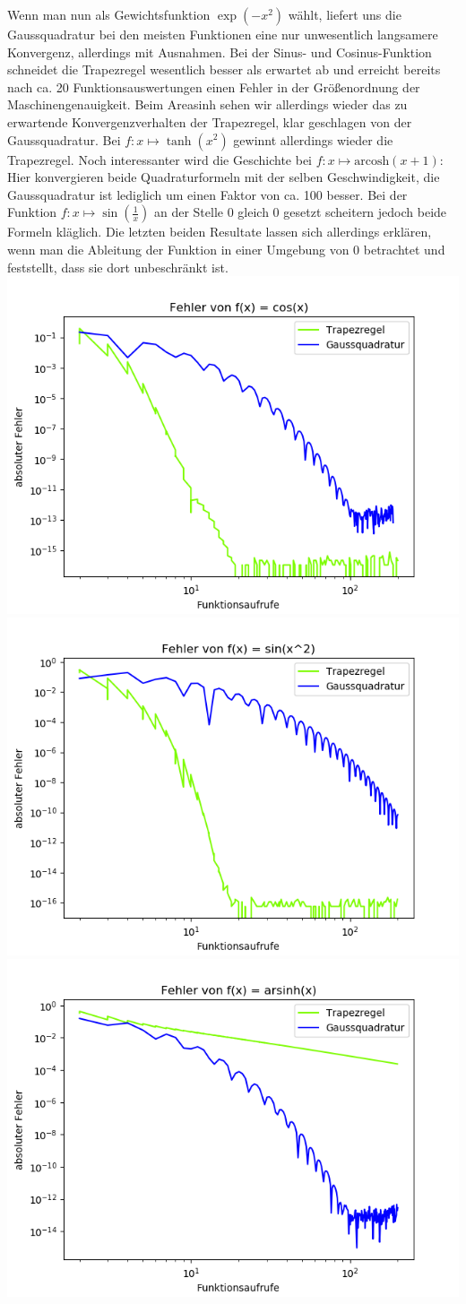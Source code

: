 Wenn man nun als Gewichtsfunktion $\exp(-x^{2})$ wählt, liefert uns die Gaussquadratur bei den meisten Funktionen eine nur unwesentlich langsamere Konvergenz, allerdings mit Ausnahmen.
Bei der Sinus- und Cosinus-Funktion schneidet die Trapezregel wesentlich besser als erwartet ab und erreicht bereits nach ca. 20 Funktionsauswertungen einen Fehler in der Größenordnung der Maschinengenauigkeit. Beim Areasinh sehen wir allerdings wieder das zu erwartende Konvergenzverhalten der Trapezregel, klar geschlagen von der Gaussquadratur. Bei $f: x \mapsto \tanh(x^2)$ gewinnt allerdings wieder die Trapezregel. Noch interessanter wird die Geschichte bei $f: x \mapsto \text{arcosh}(x+1)$: Hier konvergieren beide Quadraturformeln mit der selben Geschwindigkeit, die Gaussquadratur ist lediglich um einen Faktor von ca. 100 besser. Bei der Funktion $f: x \mapsto \sin(\frac{1}{x})$ an der Stelle 0 gleich 0 gesetzt scheitern jedoch beide Formeln kläglich. Die letzten beiden Resultate lassen sich allerdings erklären, wenn man die Ableitung der Funktion in einer Umgebung von 0 betrachtet und feststellt, dass sie dort unbeschränkt ist.
\FloatBarrier
\includegraphics[width=0.5\linewidth]{Aufgabe_1/gauss-trapez(-x^2),cos.png}
\includegraphics[width=0.5\linewidth]{Aufgabe_1/gauss-trapez(-x^2),sin(x^2).png}
\includegraphics[width=0.5\linewidth]{Aufgabe_1/gauss-trapez-arsinh.png}
